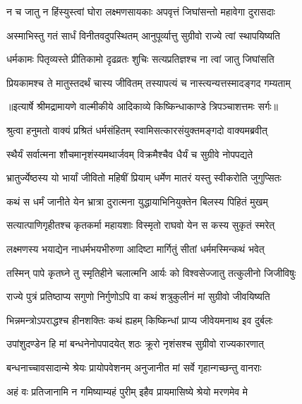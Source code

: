 \twolineshloka
{न च जातु न हिंस्युस्त्वां घोरा लक्ष्मणसायकाः}
{अपवृत्तं जिघांसन्तो महावेगा दुरासदाः} %

\twolineshloka
{अस्माभिस्तु गतं सार्धं विनीतवदुपस्थितम्}
{आनुपूर्व्यात्तु सुग्रीवो राज्ये त्वां स्थापयिष्यति} %

\twolineshloka
{धर्मकामः पितृव्यस्ते प्रीतिकामो दृढव्रतः}
{शुचिः सत्यप्रतिज्ञश्च ना त्वां जातु जिघांसति} %

\twolineshloka
{प्रियकामश्च ते मातुस्तदर्थं चास्य जीवितम्}
{तस्यापत्यं च नास्त्यन्यत्तस्मादङ्गद गम्यताम्} %


{॥इत्यार्षे श्रीमद्रामायणे वाल्मीकीये आदिकाव्ये किष्किन्धाकाण्डे त्रिपञ्चाशत्तमः सर्गः॥}


\twolineshloka
{श्रुत्वा हनुमतो वाक्यं प्रश्रितं धर्मसंहितम्}
{स्वामिसत्कारसंयुक्तमङ्गदो वाक्यमब्रवीत्} %

\twolineshloka
{स्थैर्यं सर्वात्मना शौचमानृशंस्यमथार्जवम्}
{विक्रमैश्चैव धैर्यं च सुग्रीवे नोपपद्यते} %

\twolineshloka
{भ्रातुर्ज्येष्ठस्य यो भार्यां जीवितो महिषीं प्रियाम्}
{धर्मेण मातरं यस्तु स्वीकरोति जुगुप्सितः} %

\twolineshloka
{कथं स धर्मं जानीते येन भ्रात्रा दुरात्मना}
{युद्धायाभिनियुक्तेन बिलस्य पिहितं मुखम्} %

\twolineshloka
{सत्यात्पाणिगृहीतश्च कृतकर्मा महायशाः}
{विस्मृतो राघवो येन स कस्य सुकृतं स्मरेत्} %

\twolineshloka
{लक्ष्मणस्य भयाद्येन नाधर्मभयभीरुणा}
{आदिष्टा मार्गितुं सीतां धर्ममस्मिन्कथं भवेत्} %

\twolineshloka
{तस्मिन् पापे कृतघ्ने तु स्मृतिहीने चलात्मनि}
{आर्यः को विश्वसेज्जातु तत्कुलीनो जिजीविषुः} %

\twolineshloka
{राज्ये पुत्रं प्रतिष्ठाप्य सगुणो निर्गुणोऽपि वा}
{कथं शत्रुकुलीनं मां सुग्रीवो जीवयिष्यति} %

\twolineshloka
{भिन्नमन्त्रोऽपराद्धश्च हीनशक्तिः कथं ह्यहम्}
{किष्किन्धां प्राप्य जीवेयमनाथ इव दुर्बलः} %

\twolineshloka
{उपांशुदण्डेन हि मां बन्धनेनोपपादयेत्}
{शठः क्रूरो नृशंसश्च सुग्रीवो राज्यकारणात्} %

\twolineshloka
{बन्धनाच्चावसादान्मे श्रेयः प्रायोपवेशनम्}
{अनुजानीत मां सर्वे गृहान्गच्छन्तु वानराः} %

\twolineshloka
{अहं वः प्रतिजानामि न गमिष्याम्यहं पुरीम्}
{इहैव प्रायमासिष्ये श्रेयो मरणमेव मे} %

